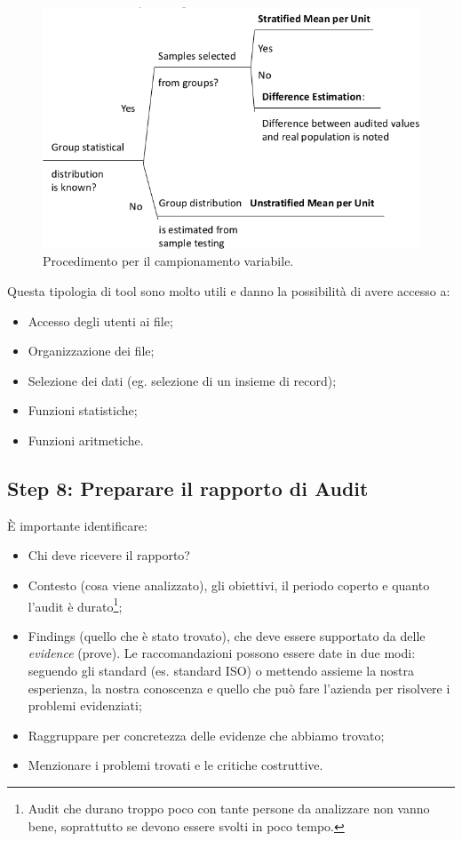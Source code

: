 \begin{figure}[h!]
        \begin{center}
                \includegraphics[scale=0.5]{res/img/variable_sampling.png}
        \end{center}
        \caption{Procedimento per il campionamento variabile.}
        \label{fig:variable:sampling}
\end{figure}


Questa tipologia di tool sono molto utili e danno la possibilità di avere
accesso a:
\begin{itemize}
\item Accesso degli utenti ai file;
\item Organizzazione dei file;
\item Selezione dei dati (eg. selezione di un insieme di record);
\item Funzioni statistiche;
\item Funzioni aritmetiche.
\end{itemize}

\subsection{Step 8: Preparare il rapporto di Audit}

È importante identificare:
\begin{itemize}
\item Chi deve ricevere il rapporto?
\item Contesto (cosa viene analizzato), gli obiettivi, il periodo coperto e
quanto l'audit è durato\footnote{Audit che durano troppo poco con tante persone
da analizzare non vanno bene, soprattutto se devono essere svolti in poco
tempo.};
\item Findings (quello che è stato trovato), che deve essere supportato da delle
\emph{evidence} (prove). Le raccomandazioni possono essere date in due modi:
seguendo gli standard (es. standard ISO) o mettendo assieme la nostra
esperienza, la nostra conoscenza e quello che può fare l'azienda per risolvere i
problemi evidenziati;
\item Raggruppare per concretezza delle evidenze che abbiamo trovato;
\item Menzionare i problemi trovati e le critiche costruttive.
\end{itemize}

